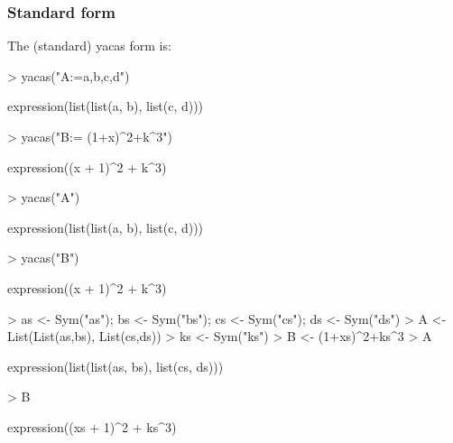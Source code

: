 \documentclass[]{article}
\begin{document}
\subsubsection{Standard form}
The (standard)
yacas form is:
\begin{Schunk}
\begin{Sinput}
> yacas("A:={{a,b},{c,d}}")
\end{Sinput}
\begin{Soutput}
expression(list(list(a, b), list(c, d)))
\end{Soutput}
\begin{Sinput}
> yacas("B:= (1+x)^2+k^3")
\end{Sinput}
\begin{Soutput}
expression((x + 1)^2 + k^3)
\end{Soutput}
\begin{Sinput}
> yacas("A")
\end{Sinput}
\begin{Soutput}
expression(list(list(a, b), list(c, d)))
\end{Soutput}
\begin{Sinput}
> yacas("B")
\end{Sinput}
\begin{Soutput}
expression((x + 1)^2 + k^3)
\end{Soutput}
\end{Schunk}

\begin{Schunk}
\begin{Sinput}
> as <- Sym("as"); bs <- Sym("bs"); cs <- Sym("cs"); ds <- Sym("ds")
> A <- List(List(as,bs), List(cs,ds))
> ks <- Sym("ks")
> B <- (1+xs)^2+ks^3
> A
\end{Sinput}
\begin{Soutput}
expression(list(list(as, bs), list(cs, ds)))
\end{Soutput}
\begin{Sinput}
> B
\end{Sinput}
\begin{Soutput}
expression((xs + 1)^2 + ks^3)
\end{Soutput}
\end{Schunk}
\end{document}
